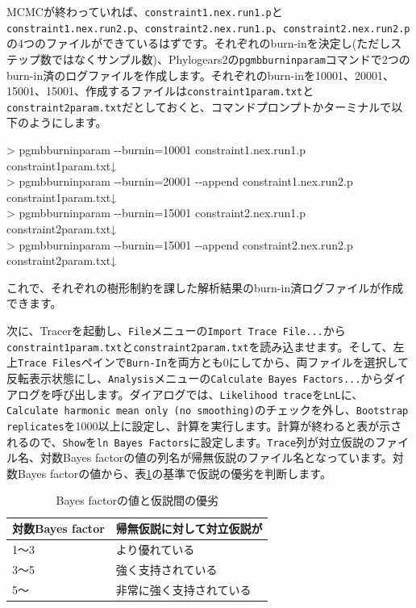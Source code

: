 \documentclass[titlepage,10pt,a4paper]{jsbook}
\newenvironment{cmd}{\begin{oframed}\raggedright\ttfamily\footnotesize\setlength{\baselineskip}{1.4em}}{\end{oframed}\vspace{-1em}}
\begin{document}
MCMCが終わっていれば、\texttt{constraint1.nex.run1.p}と\texttt{constraint1.nex.run2.p}、\texttt{constraint2.nex.run1.p}、\texttt{constraint2.nex.run2.p}の4つのファイルができているはずです。それぞれのburn-inを決定し(ただしステップ数ではなくサンプル数)、Phylogears2の\texttt{pgmbburninparam}コマンドで2つのburn-in済のログファイルを作成します。それぞれのburn-inを10001、20001、15001、15001、作成するファイルは\texttt{constraint1{\textunderscore}param.txt}と\texttt{constraint2{\textunderscore}param.txt}だとしておくと、コマンドプロンプトかターミナルで以下のようにします。
\begin{cmd}
{\textgreater} pgmbburninparam {-}{-}burnin=10001 constraint1.nex.run1.p constraint1{\textunderscore}param.txt↓\\
{\textgreater} pgmbburninparam {-}{-}burnin=20001 {-}{-}append constraint1.nex.run2.p constraint1{\textunderscore}param.txt↓\\
{\textgreater} pgmbburninparam {-}{-}burnin=15001 constraint2.nex.run1.p constraint2{\textunderscore}param.txt↓\\
{\textgreater} pgmbburninparam {-}{-}burnin=15001 {-}{-}append constraint2.nex.run2.p constraint2{\textunderscore}param.txt↓
\end{cmd}
これで、それぞれの樹形制約を課した解析結果のburn-in済ログファイルが作成できます。

次に、Tracerを起動し、\texttt{File}メニューの\texttt{Import Trace File...}から\texttt{constraint1{\textunderscore}param.txt}と\texttt{constraint2{\textunderscore}param.txt}を読み込ませます。そして、左上\texttt{Trace Files}ペインで\texttt{Burn-In}を両方とも0にしてから、両ファイルを選択して反転表示状態にし、\texttt{Analysis}メニューの\texttt{Calculate Bayes Factors...}からダイアログを呼び出します。ダイアログでは、\texttt{Likelihood trace}を\texttt{LnL}に、\texttt{Calculate harmonic mean only (no smoothing)}のチェックを外し、\texttt{Bootstrap replicates}を1000以上に設定し、計算を実行します。計算が終わると表が示されるので、\texttt{Show}を\texttt{ln Bayes Factors}に設定します。\texttt{Trace}列が対立仮説のファイル名、対数Bayes factorの値の列名が帰無仮説のファイル名となっています。対数Bayes factorの値から、表\ref{table:Bayesfactor}の基準で仮説の優劣を判断します\citep{Kass1995}。
\begin{table}[h]
\begin{center}
\footnotesize\setlength{\baselineskip}{0.9em}%
\begin{tabular}{ll} 
対数Bayes factor & 帰無仮説に対して対立仮説が \\\hline\hline
1～3 & より優れている \\
3～5 & 強く支持されている \\
5～ & 非常に強く支持されている \\
\end{tabular}
\end{center}
\caption{Bayes factorの値と仮説間の優劣}\label{table:Bayesfactor}
\end{table}
\end{document}

